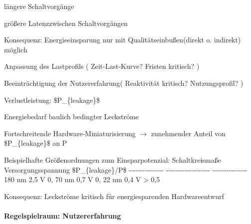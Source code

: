 \documentclass[a4paper]{article}
\begin{document}
\begin{multicols}{3}
\begin{itemize*}
\begin{enumerate*}
            \item längere Schaltvorgänge
            \item größere Latenzzwischen Schaltvorgängen
        \end{enumerate*}
        \item
        Konsequenz: Energieeinsparung nur mit Qualitätseinbußen(direkt o.
        indirekt) möglich
        \begin{itemize*}
            \item Anpassung des Lastprofils ( Zeit-Last-Kurve? Fristen kritisch? )
            \item Beeinträchtigung der Nutzererfahrung( Reaktivität kritisch? Nutzungsprofil? )
        \end{itemize*}
    \end{itemize*}

    Verlustleistung: \$P\_\{leakage\}\$

    \begin{itemize*}
        \item
        Energiebedarf baulich bedingter Leckströme
        \item
        Fortschreitende Hardware-Miniaturisierung
        $\rightarrow$ zunehmender Anteil von
        \$P\_\{leakage\}\$ an P
        \item
        Beispielhafte Größenordnungen zum Einsparpotenzial: \textbar{}
        Schaltkreismaße \textbar{} Versorgungsspannung \textbar{}
        \$P\_\{leakage\}/P\$ \textbar{} \textbar{}
        -\/-\/-\/-\/-\/-\/-\/-\/-\/-\/-\/-\/-\/-\/- \textbar{}
        -\/-\/-\/-\/-\/-\/-\/-\/-\/-\/-\/-\/-\/-\/-\/-\/-\/-\/- \textbar{}
        -\/-\/-\/-\/-\/-\/-\/-\/-\/-\/-\/-\/-\/-\/- \textbar{} \textbar{} 180
        nm \textbar{} 2,5 V \textbar{} 0, \textbar{} \textbar{} 70 nm
        \textbar{} 0,7 V \textbar{} 0, \textbar{} \textbar{} 22 nm \textbar{}
        0,4 V \textbar{} \textgreater{} 0,5 \textbar{}
        \item
        Konsequenz: Leckströme kritisch für energiesparenden Hardwareentwurf
    \end{itemize*}


    \paragraph{Regelspielraum:
        Nutzererfahrung}


\end{multicols}
\end{document}
